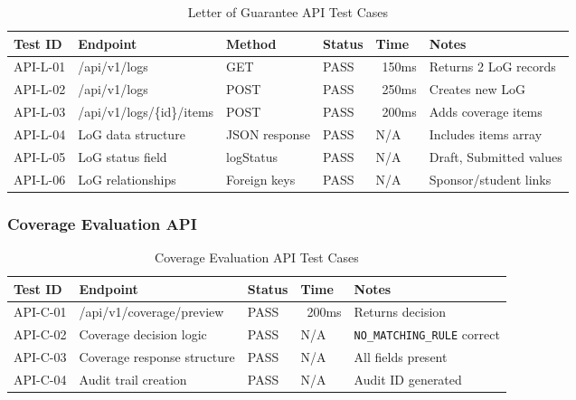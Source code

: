 \begin{table}[h!]
\centering
\caption{Letter of Guarantee API Test Cases}
\label{tab:appendix_log_api}
\renewcommand{\arraystretch}{1.15}
\setlength{\tabcolsep}{4pt}
\begin{tabularx}{\textwidth}{@{}
  >{\RaggedLeft\arraybackslash}p{1.5cm}
  >{\RaggedRight\arraybackslash}p{3.8cm}
  >{\RaggedLeft\arraybackslash}p{1.5cm}
  >{\RaggedLeft\arraybackslash}p{1.8cm}
  >{\RaggedLeft\arraybackslash}p{1.8cm}
  >{\RaggedRight\arraybackslash}X
@{}}
\toprule
\textbf{Test ID} & \textbf{Endpoint} & \textbf{Method} & \textbf{Status} & \textbf{Time} & \textbf{Notes} \\
\midrule
API-L-01 & /api/v1/logs & GET & PASS & ~150ms & Returns 2 LoG records \\
API-L-02 & /api/v1/logs & POST & PASS & ~250ms & Creates new LoG \\
API-L-03 & /api/v1/logs/\{id\}/items & POST & PASS & ~200ms & Adds coverage items \\
API-L-04 & LoG data structure & JSON response & PASS & N/A & Includes items array \\
API-L-05 & LoG status field & logStatus & PASS & N/A & Draft, Submitted values \\
API-L-06 & LoG relationships & Foreign keys & PASS & N/A & Sponsor/student links \\
\bottomrule
\end{tabularx}
\end{table}

\subsubsection{Coverage Evaluation API}

\begin{table}[h!]
\centering
\caption{Coverage Evaluation API Test Cases}
\label{tab:appendix_coverage_api}
\renewcommand{\arraystretch}{1.15}
\setlength{\tabcolsep}{4pt}
\begin{tabularx}{\textwidth}{@{}
  >{\RaggedLeft\arraybackslash}p{1.5cm}
  >{\RaggedRight\arraybackslash}p{4.0cm}
  >{\RaggedLeft\arraybackslash}p{2.0cm}
  >{\RaggedLeft\arraybackslash}p{1.8cm}
  >{\RaggedRight\arraybackslash}X
@{}}
\toprule
\textbf{Test ID} & \textbf{Endpoint} & \textbf{Status} & \textbf{Time} & \textbf{Notes} \\
\midrule
API-C-01 & /api/v1/coverage/preview & PASS & ~200ms & Returns decision \\
API-C-02 & Coverage decision logic & PASS & N/A & \texttt{NO\_MATCHING\_RULE} correct \\
API-C-03 & Coverage response structure & PASS & N/A & All fields present \\
API-C-04 & Audit trail creation & PASS & N/A & Audit ID generated \\
\bottomrule
\end{tabularx}
\end{table}

